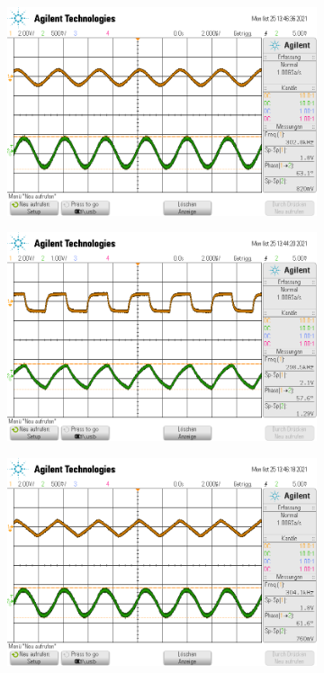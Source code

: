 \begin{figure}
  \centering
  \begin{subfigure}{0.4\textwidth}
    \centering
    \includegraphics[width=\textwidth]{ressources/integral_sinus.png}
  \end{subfigure}
  \begin{subfigure}{0.4\textwidth}
    \centering
    \includegraphics[width=\textwidth]{ressources/integral_rechteck.png}
  \end{subfigure}
  \begin{subfigure}{0.4\textwidth}
    \centering
    \includegraphics[width=\textwidth]{ressources/integral_dreieck.png}

\end{subfigure}
\end{figure}
